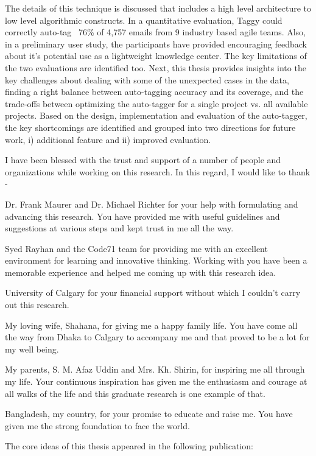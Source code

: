 \documentclass{ucalgthes1}
\begin{document}
The details of this technique is discussed that includes a high level architecture to low level algorithmic constructs. In a quantitative evaluation, Taggy could correctly auto-tag ~76\% of 4,757 emails from 9 industry based agile teams. Also, in a preliminary user study, the participants have provided encouraging feedback about it's potential use as a lightweight knowledge center. The key limitations of the two evaluations are identified too. Next, this thesis provides insights into the key challenges about dealing with some of the unexpected cases in the data, finding a right balance between auto-tagging accuracy and its coverage, and the trade-offs between optimizing the auto-tagger for a single project vs. all available projects. Based on the design, implementation and evaluation of the auto-tagger, the key shortcomings are identified and grouped into two directions for future work, i) additional feature and ii) improved evaluation.
\newpage

{}
I have been blessed with the trust and support of a number of people and organizations while working on this research. In this regard, I would like to thank -

Dr. Frank Maurer and Dr. Michael Richter for your help with formulating and advancing this research. You have provided me with useful guidelines and suggestions at various steps and kept trust in me all the way.

Syed Rayhan and the Code71 team for providing me with an excellent environment for learning and innovative thinking. Working with you have been a memorable experience and helped me coming up with this research idea.

University of Calgary for your financial support without which I couldn't carry out this research.

My loving wife, Shahana, for giving me a happy family life. You have come all the way from Dhaka to Calgary to accompany me and that proved to be a lot for my well being.

My parents, S. M. Afaz Uddin and Mrs. Kh. Shirin, for inspiring me all through my life. Your continuous inspiration has given me the enthusiasm and courage at all walks of the life and this graduate research is one example of that.

Bangladesh, my country, for your promise to educate and raise me. You have given me the strong foundation to face the world.

\newpage

{} 
The core ideas of this thesis appeared in the following publication:
\end{document}
